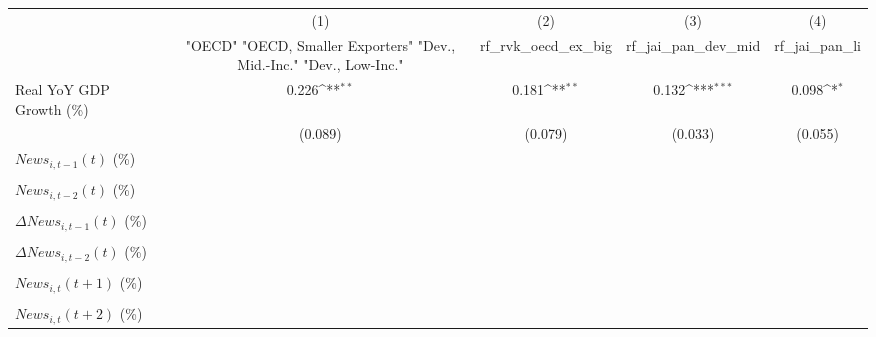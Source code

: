 {
\def\sym#1{\ifmmode^{#1}\else\(^{#1}\)\fi}
\begin{tabular}{l*{4}{c}}
\toprule
                    &\multicolumn{1}{c}{(1)}&\multicolumn{1}{c}{(2)}&\multicolumn{1}{c}{(3)}&\multicolumn{1}{c}{(4)}\\
                    &\multicolumn{1}{c}{ "OECD" "OECD, Smaller Exporters" "Dev., Mid.-Inc." "Dev., Low-Inc."}&\multicolumn{1}{c}{rf_rvk_oecd_ex_big}&\multicolumn{1}{c}{rf_jai_pan_dev_mid}&\multicolumn{1}{c}{rf_jai_pan_li}\\
\midrule
Real YoY GDP Growth (\%)&       0.226\sym{**} &       0.181\sym{**} &       0.132\sym{***}&       0.098\sym{*}  \\
                    &     (0.089)         &     (0.079)         &     (0.033)         &     (0.055)         \\
\addlinespace
$ News_{i,t-1}(t)$ (\%)&                     &                     &                     &                     \\
                    &                     &                     &                     &                     \\
\addlinespace
$ News_{i,t-2}(t)$ (\%)&                     &                     &                     &                     \\
                    &                     &                     &                     &                     \\
\addlinespace
$ \Delta News_{i,t-1}(t)$ (\%)&                     &                     &                     &                     \\
                    &                     &                     &                     &                     \\
\addlinespace
$ \Delta News_{i,t-2}(t)$ (\%)&                     &                     &                     &                     \\
                    &                     &                     &                     &                     \\
\addlinespace
$ News_{i,t}(t+1)$ (\%)&                     &                     &                     &                     \\
                    &                     &                     &                     &                     \\
\addlinespace
$ News_{i,t}(t+2)$ (\%)&                     &                     &                     &                     \\

\end{tabular}}
